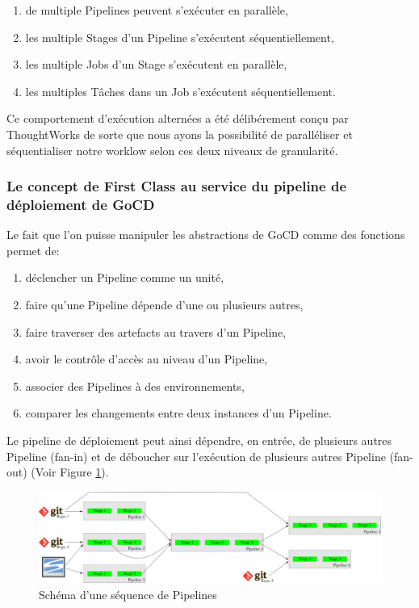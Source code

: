     \begin{enumerate}
      \item de multiple Pipelines peuvent s'exécuter en parallèle,
      \item les multiple Stages d'un Pipeline s'exécutent séquentiellement,
      \item les multiple Jobs d'un Stage s'exécutent en parallèle,
      \item les multiples Tâches dans un Job s'exécutent séquentiellement.\\
    \end{enumerate}

    Ce comportement d'exécution alternées a été délibérement conçu par ThoughtWorks de sorte que nous ayons la possibilité de paralléliser et séquentialiser notre worklow selon ces deux niveaux de granularité.

    \subsubsection{Le concept de First Class au service du pipeline de déploiement de GoCD}
    Le fait que l'on puisse manipuler les abstractions de GoCD comme des fonctions permet de:\\

    \begin{enumerate}
      \item déclencher un Pipeline comme un unité,
      \item faire qu'une Pipeline dépende d'une ou plusieurs autres,
      \item faire traverser des artefacts au travers d'un Pipeline,
      \item avoir le contrôle d'accès au niveau d'un Pipeline,
      \item associer des Pipelines à des environnements,
      \item comparer les changements entre deux instances d'un Pipeline.\\
    \end{enumerate}

    Le pipeline de déploiement peut ainsi dépendre, en entrée, de plusieurs autres Pipeline (fan-in) et de déboucher sur l'exécution de plusieurs autres Pipeline (fan-out) (Voir Figure \ref{VSM}).

    \begin{figure}
      \begin{center}
        \includegraphics[scale=0.7]{images/VSM.png}
      \end{center}
      \caption{Schéma d'une séquence de Pipelines}
      \label{VSM}
    \end{figure}

